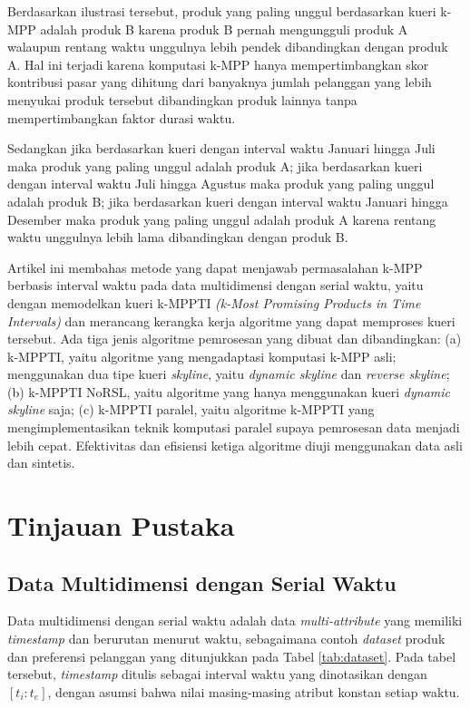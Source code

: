 \documentclass[conference]{IEEEtran}
\begin{document}
Berdasarkan ilustrasi tersebut, produk yang paling unggul berdasarkan kueri k-MPP adalah produk B karena produk B pernah mengungguli produk A walaupun rentang waktu unggulnya lebih pendek dibandingkan dengan produk A. Hal ini terjadi karena komputasi k-MPP hanya mempertimbangkan skor kontribusi pasar yang dihitung dari banyaknya jumlah pelanggan yang lebih menyukai produk tersebut dibandingkan produk lainnya tanpa mempertimbangkan faktor durasi waktu.

Sedangkan jika berdasarkan kueri dengan interval waktu Januari hingga Juli maka produk yang paling unggul adalah produk A; jika berdasarkan kueri dengan interval waktu Juli hingga Agustus maka produk yang paling unggul adalah produk B; jika berdasarkan kueri dengan interval waktu Januari hingga Desember maka produk yang paling unggul adalah produk A karena rentang waktu unggulnya lebih lama dibandingkan dengan produk B.

Artikel ini membahas metode yang dapat menjawab permasalahan k-MPP berbasis interval waktu pada data multidimensi dengan serial waktu, yaitu dengan memodelkan kueri k-MPPTI \textit{(k-Most Promising Products in Time Intervals)} dan merancang kerangka kerja algoritme yang dapat memproses kueri tersebut. Ada tiga jenis algoritme pemrosesan yang dibuat dan dibandingkan: (a) k-MPPTI, yaitu algoritme yang mengadaptasi komputasi k-MPP asli; menggunakan dua tipe kueri \textit{skyline}, yaitu \textit{dynamic skyline} dan \textit{reverse skyline}; (b) k-MPPTI NoRSL, yaitu algoritme yang hanya menggunakan kueri \textit{dynamic skyline} saja; (c) k-MPPTI paralel, yaitu algoritme k-MPPTI yang mengimplementasikan teknik komputasi paralel supaya pemrosesan data menjadi lebih cepat. Efektivitas dan efisiensi ketiga algoritme diuji menggunakan data asli dan sintetis.

\section{Tinjauan Pustaka}
\subsection{Data Multidimensi dengan Serial Waktu}
Data multidimensi dengan serial waktu adalah data \textit{multi-attribute} yang memiliki \textit{timestamp} dan berurutan menurut waktu, sebagaimana contoh \textit{dataset} produk dan preferensi pelanggan yang ditunjukkan pada Tabel \ref{tab:dataset}. Pada tabel tersebut, \textit{timestamp} ditulis sebagai interval waktu yang dinotasikan dengan $[t_i:t_e]$, dengan asumsi bahwa nilai masing-masing atribut konstan setiap waktu. 
\end{document}
